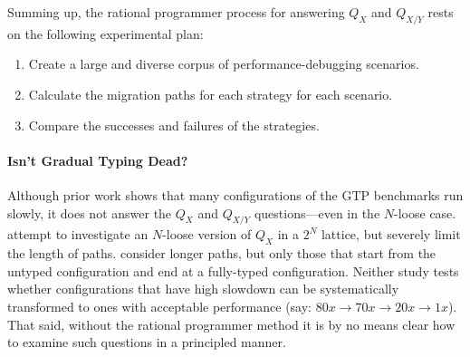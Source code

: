 Summing up, the rational programmer process for answering $Q_X$ and $Q_{X/Y}$ rests on the following
experimental plan:
\begin{enumerate}

\item Create a large and diverse corpus of performance-debugging scenarios.

\item Calculate the migration paths for each strategy for
  each scenario.

\item Compare the successes and failures of the strategies.

\end{enumerate}

\paragraph{Isn't Gradual Typing Dead?}
Although prior work shows that many configurations of the GTP benchmarks
run slowly, it does not answer the $Q_X$ and $Q_{X/Y}$ questions---even
in the $N$-loose case.  \citet{gtnffvf-jfp-2019} attempt to
investigate an $N$-loose version of  $Q_X$ in a $2^N$ lattice, but severely limit the length of paths.
\citet{g-deep-shallow} consider longer paths, but only those that start from the untyped
configuration and end at a fully-typed configuration.
Neither study tests whether
configurations that have high slowdown can be systematically
transformed to ones with acceptable performance (say: $80x \rightarrow 70x
\rightarrow 20x \rightarrow 1x$). That said, without the rational programmer 
method it is by no means clear how to examine such questions in a
principled manner.
